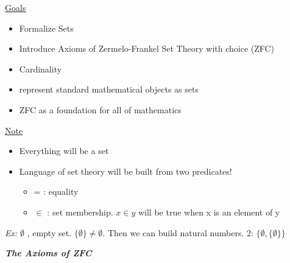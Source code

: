 \documentclass{article}
\begin{document}
    \underline{Goals}
    \begin{itemize}
        \item Formalize Sets
        \item Introduce Axioms of Zermelo-Frankel Set Theory with choice (ZFC)
        \item Cardinality
        \item represent standard mathematical objects as sets
        \item ZFC as a foundation for all of mathematics
    \end{itemize}

    \underline{Note}
    \begin{itemize}
        \item Everything will be a set
        \item Language of set theory will be built from two predicates!
        \begin{itemize}
            \item = : equality
            \item $\in$ : set membership. $x\in y$ will be true when x is an element of y
        \end{itemize}
    \end{itemize}

    \emph{Ex:} $\emptyset$ , empty set. $\{\emptyset\} \neq \emptyset$. Then we can build natural numbers. 2: $\{\emptyset,\{\emptyset\}\}$

    \vspace{1em}
    \noindent\textbf{\emph{The Axioms of ZFC}}
\end{document}
